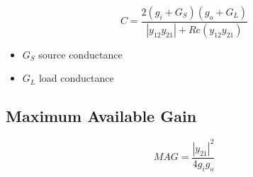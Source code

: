 \begin{equation}
C = \dfrac{2(g_i+G_S)(g_o+G_L)}{|y_{12}y_{21}|+Re(y_{12}y_{21})}
\end{equation}

\begin{itemize}
	\item $G_S$ source conductance
	\item $G_L$ load conductance
\end{itemize}

\subsection{Maximum Available Gain}

\begin{equation}
MAG = \dfrac{|y_{21}|^2}{4g_ig_o}
\end{equation}